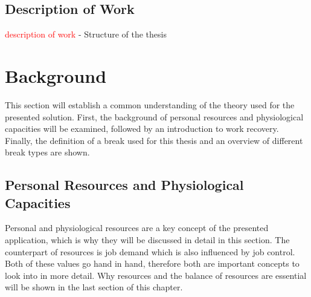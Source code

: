 \documentclass{hasel_thesis}
\begin{document}
\section{Description of Work}
\textcolor{red}{description of work}
- Structure of the thesis


%

 \chapter{Background} \label{background}

This section will establish a common understanding of the theory used for the presented solution. First, the background of personal resources and physiological capacities will be examined, followed by an introduction to work recovery. Finally, the definition of a break used for this thesis and an overview of different break types are shown.

\section{Personal Resources and Physiological Capacities}

Personal and physiological resources are a key concept of the presented application, which is why they will be discussed in detail in this section. The counterpart of resources is job demand which is also influenced by job control. Both of these values go hand in hand, therefore both are important concepts to look into in more detail. Why resources and the balance of resources are essential will be shown in the last section of this chapter.
\end{document}

